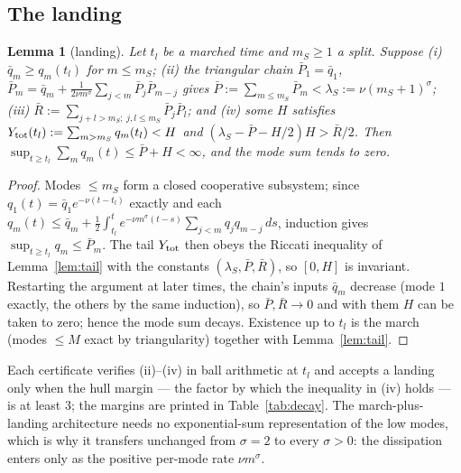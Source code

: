 \documentclass[11pt,a4paper]{article}
\theoremstyle{plain}
\newtheorem{lemma}[theorem]{Lemma}
\theoremstyle{definition}
\begin{document}
\subsection{The landing}
\begin{lemma}[landing]\label{lem:landing}
Let $t_l$ be a marched time and $m_S\ge1$ a split. Suppose (i) $\bar q_m\ge q_m(t_l)$ for $m\le m_S$; (ii) the triangular chain $\bar P_1=\bar q_1$, $\bar P_m=\bar q_m+\frac{1}{2\nu m^\sigma}\sum_{j<m}\bar P_j\bar P_{m-j}$ gives $\bar P:=\sum_{m\le m_S}\bar P_m<\lambda_S:=\nu(m_S+1)^\sigma$; (iii) $\bar R:=\sum_{j+l>m_S;\ j,l\le m_S}\bar P_j\bar P_l$; and (iv) some $H$ satisfies $Y_{\rm tot}(t_l):=\sum_{m>m_S}q_m(t_l)<H$ and $(\lambda_S-\bar P-H/2)H>\bar R/2$. Then $\sup_{t\ge t_l}\sum_mq_m(t)\le\bar P+H<\infty$, and the mode sum tends to zero.
\end{lemma}
\begin{proof}
Modes $\le m_S$ form a closed cooperative subsystem; since $q_1(t)=\bar q_1e^{-\nu(t-t_l)}$ exactly and each $q_m(t)\le\bar q_m+\frac12\int_{t_l}^te^{-\nu m^\sigma(t-s)}\sum_{j<m}q_jq_{m-j}\,ds$, induction gives $\sup_{t\ge t_l}q_m\le\bar P_m$. The tail $Y_{\rm tot}$ then obeys the Riccati inequality of Lemma~\ref{lem:tail} with the constants $(\lambda_S,\bar P,\bar R)$, so $[0,H]$ is invariant. Restarting the argument at later times, the chain's inputs $\bar q_m$ decrease (mode $1$ exactly, the others by the same induction), so $\bar P,\bar R\to0$ and with them $H$ can be taken to zero; hence the mode sum decays. Existence up to $t_l$ is the march (modes $\le M$ exact by triangularity) together with Lemma~\ref{lem:tail}.
\end{proof}
Each certificate verifies (ii)--(iv) in ball arithmetic at $t_l$ and accepts a landing only when the hull margin --- the factor by which the inequality in (iv) holds --- is at least $3$; the margins are printed in Table~\ref{tab:decay}. The march-plus-landing architecture needs no exponential-sum representation of the low modes, which is why it transfers unchanged from $\sigma=2$ to every $\sigma>0$: the dissipation enters only as the positive per-mode rate $\nu m^\sigma$.
\end{document}
